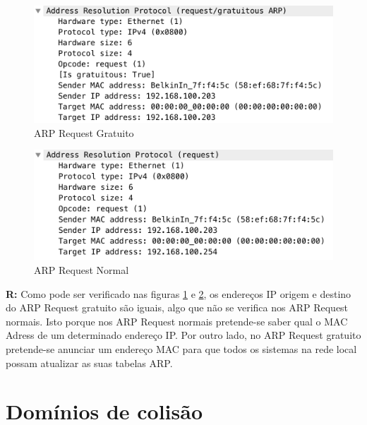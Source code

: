\documentclass{llncs}
\begin{document}
\begin{figure}[H]
\begin{center}
\includegraphics[scale=0.45]{16_gratuito.png} 
\end{center}
\caption{\label{fig:16_gratuito}ARP Request Gratuito}
\end{figure} 
\par
\begin{figure}[H]
\begin{center}
\includegraphics[scale=0.45]{16_request_normal.png} 
\end{center}
\caption{\label{fig:16_request_normal}ARP Request Normal}
\end{figure} 
\par
\textbf{R:} Como pode ser verificado nas figuras \ref{fig:16_gratuito} e 
\ref{fig:16_request_normal}, os endereços IP origem e destino do ARP Request gratuito são iguais, algo que não se verifica nos ARP Request normais. Isto porque nos ARP Request normais pretende-se saber qual o MAC Adress de um determinado endereço IP. Por outro lado, no ARP Request gratuito pretende-se anunciar um endereço MAC para que todos os sistemas na rede local possam atualizar as suas tabelas ARP.


\section{Domínios de colisão}
\end{document}
